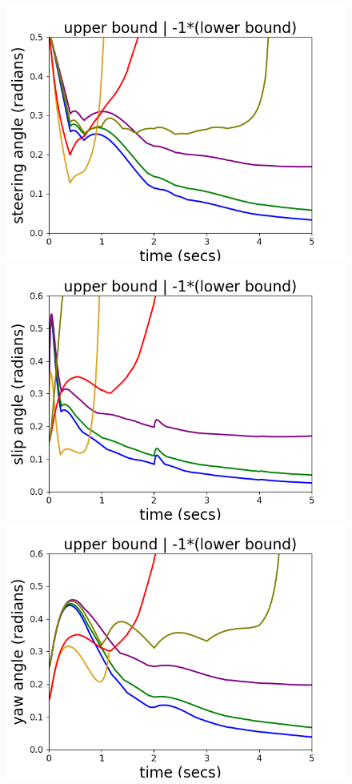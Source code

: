 \begin{figure}
\includegraphics[scale = 0.39]{autocarImages/ubToolSteering.png}\hspace{-2.2em}
\includegraphics[scale = 0.39]{autocarImages/ubToolSlip.png}
\includegraphics[scale = 0.39]{autocarImages/ubToolYaw.png}\hspace{-2.2em}

\end{figure}
